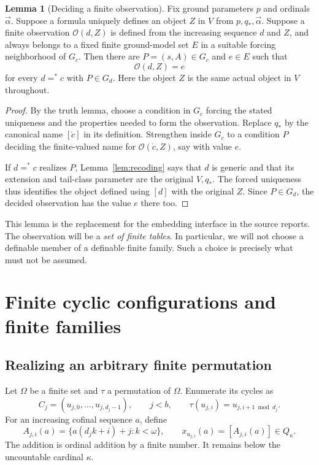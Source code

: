 \documentclass[11pt,letterpaper]{article}
\theoremstyle{definition}
\newtheorem{lemma}[definition]{Lemma}
\numberwithin{equation}{section}
\begin{document}
\begin{lemma}[Deciding a finite observation]\label{lem:decision}
Fix ground parameters $p$ and ordinals $\vec\alpha$. Suppose a formula
uniquely defines an object $Z$ in $V$ from $p,q_*,\vec\alpha$. Suppose a
finite observation $\mathcal O(d,Z)$ is defined from the increasing sequence
$d$ and $Z$, and always belongs to a fixed finite ground-model set $E$ in a
suitable forcing neighborhood of $G_c$.
Then there are $P=(s,A)\in G_c$ and $e\in E$ such that
\[
              \mathcal O(d,Z)=e
\]
for every $d=^*c$ with $P\in G_d$. Here the object $Z$ is the same actual
object in $V$ throughout.
\end{lemma}

\begin{proof}
By the truth lemma, choose a condition in $G_c$ forcing the stated uniqueness
and the properties needed to form the observation. Replace $q_*$ by the
canonical name $[\dot c]$ in its definition. Strengthen inside $G_c$ to a
condition $P$ deciding the finite-valued name for $\mathcal O(\dot c,Z)$,
say with value $e$.

If $d=^*c$ realizes $P$, Lemma~\ref{lem:recoding} says that $d$ is generic
and that its extension and tail-class parameter are the original $V,q_*$.
The forced uniqueness thus identifies the object defined using $[d]$ with
the original $Z$. Since $P\in G_d$, the decided observation has the value
$e$ there too.
\end{proof}

This lemma is the replacement for the embedding interface in the source
reports. The observation will be a \emph{set of finite tables}. In particular,
we will not choose a definable member of a definable finite family. Such a
choice is precisely what must not be assumed.

\section{Finite cyclic configurations and finite families}\label{sec:tables}

\subsection{Realizing an arbitrary finite permutation}

Let $\Omega$ be a finite set and $\tau$ a permutation of $\Omega$. Enumerate
its cycles as
\[
 C_j=(u_{j,0},\ldots,u_{j,d_j-1}),\qquad j<b,
 \qquad \tau(u_{j,i})=u_{j,i+1\bmod d_j}.
\]
For an increasing cofinal sequence $a$, define
\begin{equation}\label{eq:cyclecode}
 A_{j,i}(a)=\{a(d_j k+i)+j:k<\omega\},\qquad
 x_{u_{j,i}}(a)=[A_{j,i}(a)]\in Q_\kappa.
\end{equation}
The addition is ordinal addition by a finite number. It remains below the
uncountable cardinal $\kappa$.
\end{document}
